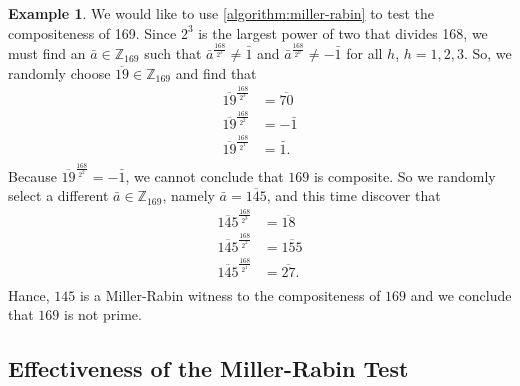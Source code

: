 \documentclass[12pt, titlepage]{amsart}
\newcommand\Z{{\mathbb Z}}
\theoremstyle{definition}
\newtheorem{example}{Example}[subsection]
\begin{document}
	\begin{example}
		We would like to use \cref{algorithm:miller-rabin} to test the compositeness of 169. Since $2^3$ is the largest power of two that divides 168, we must find an $\bar{a}\in \Z_{169}$ such that $\bar{a}^{\frac{168}{2^3}} \neq \bar{1}$ and $\bar{a}^{\frac{168}{2^h}} \neq -\bar{1}$ for all $h$, $h=1,2,3$. So, we randomly choose $\overline{19} \in \Z_{169}$ and find that
		\begin{align*}
			\overline{19}^{\frac{168}{2^3}} &= \overline{70} \\
			\overline{19}^{\frac{168}{2^2}} &= -\bar{1} \\
			\overline{19}^{\frac{168}{2^1}} &= \bar{1}. \\
		\end{align*}
		Because $\overline{19}^{\frac{168}{2^2}} = -\bar{1}$, we cannot conclude that $169$ is composite. So we randomly select a different $\bar{a} \in \Z_{169}$, namely $\bar{a} = \overline{145}$, and this time discover that
		\begin{align*}
		\overline{145}^{\frac{168}{2^3}} &= \overline{18} \\
		\overline{145}^{\frac{168}{2^2}} &= \overline{155} \\
		\overline{145}^{\frac{168}{2^1}} &= \overline{27}. \\
		\end{align*}
		Hance, $145$ is a Miller-Rabin witness to the compositeness of $169$ and we conclude that $169$ is not prime. 
	\end{example}
	
	
	\subsection{Effectiveness of the Miller-Rabin Test}	
	
	
	
	
\end{document}

